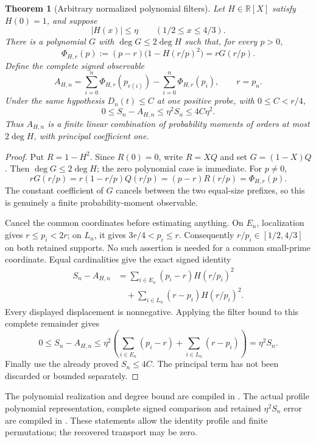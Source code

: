 \documentclass[11pt]{article}
\newtheorem{theorem}{Theorem}[section]
\theoremstyle{definition}
\begin{document}
\begin{theorem}[Arbitrary normalized polynomial filters]
Let $H\in\mathbb R[X]$ satisfy $H(0)=1$, and suppose
\[
 |H(x)|\le\eta\qquad(1/2\le x\le4/3).
\]
There is a polynomial $G$ with $\deg G\le2\deg H$ such that, for every
$p>0$,
\[
 \Phi_{H,r}(p):=(p-r)\bigl(1-H(r/p)^2\bigr)=rG(r/p).
\]
Define the complete signed observable
\[
 A_{H,n}=\sum_{i=0}^{n}\Phi_{H,r}(p_{e(i)})
              -\sum_{i=0}^{n}\Phi_{H,r}(p_i),\qquad r=p_n.
\]
Under the same hypothesis $D_n(t)\le C$ at one positive probe,
with $0\le C<r/4$,
\[
 0\le S_n-A_{H,n}\le\eta^2S_n\le4C\eta^2.
\]
Thus $A_{H,n}$ is a finite linear combination of probability moments
of orders at most $2\deg H$, with principal coefficient one.
\end{theorem}
\begin{proof}
Put $R=1-H^2$. Since $R(0)=0$, write $R=XQ$ and set
$G=(1-X)Q$. Then $\deg G\le2\deg H$; the zero polynomial case
is immediate. For $p\ne0$,
\[
 rG(r/p)=r(1-r/p)Q(r/p)
        =(p-r)R(r/p)=\Phi_{H,r}(p).
\]
The constant coefficient of $G$ cancels between the two equal-size
prefixes, so this is genuinely a finite probability-moment observable.

Cancel the common coordinates before estimating anything. On $E_n$,
localization gives $r\le p_i<2r$; on $L_n$, it gives
$3r/4<p_i\le r$. Consequently $r/p_i\in[1/2,4/3]$
on both retained supports. No such assertion is needed for a common
small-prime coordinate. Equal cardinalities give the exact signed identity
\[
\begin{split}
 S_n-A_{H,n}
 &=\sum_{i\in E_n}(p_i-r)H(r/p_i)^2\\
 &\quad+\sum_{i\in L_n}(r-p_i)H(r/p_i)^2.
\end{split}
\]
Every displayed displacement is nonnegative. Applying the filter bound
to this complete remainder gives
\[
 0\le S_n-A_{H,n}
 \le\eta^2\left(\sum_{i\in E_n}(p_i-r)
                +\sum_{i\in L_n}(r-p_i)\right)
 =\eta^2S_n.
\]
Finally use the already proved $S_n\le4C$.
The principal term has not been discarded or bounded separately.
\end{proof}

\begin{flushleft}
The polynomial realization and degree bound are compiled in
.
The actual profile polynomial representation, complete signed comparison
and retained $\eta^2S_n$ error are compiled in
.
These statements allow the identity profile and finite permutations;
the recovered transport may be zero.
\end{flushleft}
\end{document}
